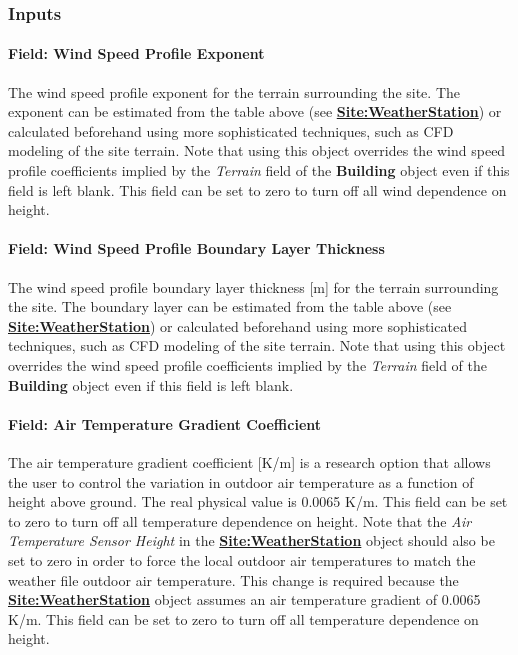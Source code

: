 \subsubsection{Inputs}\label{inputs-10-009}

\paragraph{Field: Wind Speed Profile Exponent}\label{field-wind-speed-profile-exponent-1}

The wind speed profile exponent for the terrain surrounding the site. The exponent can be estimated from the table above (see \textbf{\hyperref[siteweatherstation]{Site:WeatherStation}}) or calculated beforehand using more sophisticated techniques, such as CFD modeling of the site terrain. Note that using this object overrides the wind speed profile coefficients implied by the \emph{Terrain} field of the \textbf{Building} object even if this field is left blank. This field can be set to zero to turn off all wind dependence on height.

\paragraph{Field: Wind Speed Profile Boundary Layer Thickness}\label{field-wind-speed-profile-boundary-layer-thickness-1}

The wind speed profile boundary layer thickness {[}m{]} for the terrain surrounding the site. The boundary layer can be estimated from the table above (see \textbf{\hyperref[siteweatherstation]{Site:WeatherStation}}) or calculated beforehand using more sophisticated techniques, such as CFD modeling of the site terrain. Note that using this object overrides the wind speed profile coefficients implied by the \emph{Terrain} field of the \textbf{Building} object even if this field is left blank.

\paragraph{Field: Air Temperature Gradient Coefficient}\label{field-air-temperature-gradient-coefficient}

The air temperature gradient coefficient {[}K/m{]} is a research option that allows the user to control the variation in outdoor air temperature as a function of height above ground. The real physical value is 0.0065 K/m. This field can be set to zero to turn off all temperature dependence on height. Note that the \emph{Air Temperature Sensor Height} in the \textbf{\hyperref[siteweatherstation]{Site:WeatherStation}} object should also be set to zero in order to force the local outdoor air temperatures to match the weather file outdoor air temperature. This change is required because the \textbf{\hyperref[siteweatherstation]{Site:WeatherStation}} object assumes an air temperature gradient of 0.0065 K/m. This field can be set to zero to turn off all temperature dependence on height.

